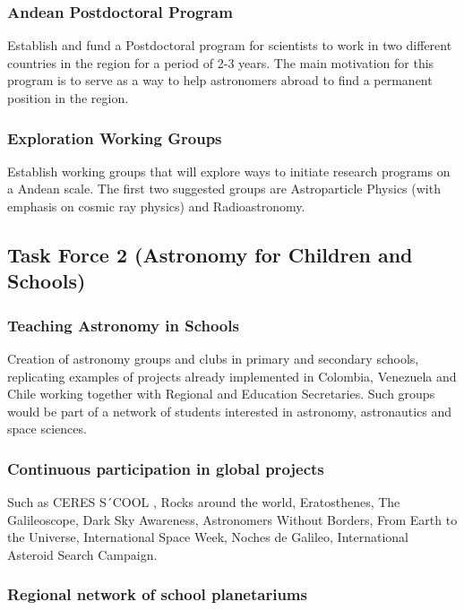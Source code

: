 \documentclass[12pt]{article}
\begin{document}
\subsubsection*{Andean Postdoctoral Program}
Establish and fund a Postdoctoral program for scientists to work in
two different countries in the region for a period of 2-3 years. The
main motivation for this program is to serve as a way to help
astronomers abroad to find a permanent position in the region. 

\subsubsection*{Exploration Working Groups}
Establish working groups that will explore ways to initiate research
programs on a Andean scale. The first two suggested groups are
Astroparticle Physics (with emphasis on cosmic ray physics) and
Radioastronomy. 

\subsection{Task Force 2 (Astronomy for Children and Schools)}


\subsubsection*{Teaching Astronomy in Schools}
Creation of astronomy groups and clubs  in primary  and secondary
schools, replicating examples of projects already implemented in
Colombia, Venezuela and Chile  working together with Regional and
Education Secretaries. Such groups would be part of a network of
students  interested in astronomy, astronautics and space sciences.  

\subsubsection*{Continuous participation in  global projects} 

Such as  CERES S´COOL , Rocks around the world,  Eratosthenes, The
Galileoscope,  Dark Sky Awareness, Astronomers Without Borders, From
Earth to the Universe, International Space Week,   Noches de Galileo,
International Asteroid Search Campaign. 

\subsubsection*{Regional network of school planetariums} 
\end{document}
